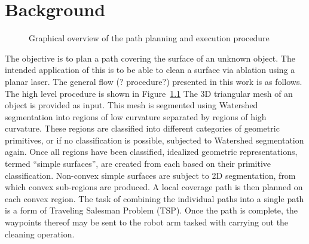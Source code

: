 \chapter{Background}

\begin{figure}[hb]
	\centering
{}
	\caption{Graphical overview of the path planning and execution procedure}
	\label{fig:bkgd_overview}
\end{figure}
The objective is to plan a path covering the surface of an unknown object.
The intended application of this is to be able to clean a surface via ablation using a planar laser.
The general flow (? procedure?) presented in this work is as follows.
The high level procedure is shown in Figure~\ref{fig:bkgd_overview}
The 3D triangular mesh of an object is provided as input.
This mesh is segmented using Watershed segmentation into regions of low curvature separated by regions of high curvature.
These regions are classified into different categories of geometric primitives, or if no classification is possible, subjected to Watershed segmentation again.
Once all regions have been classified, idealized geometric representations, termed ``simple surfaces'', are created from each based on their primitive classification.
Non-convex simple surfaces are subject to 2D segmentation, from which convex sub-regions are produced.
A local coverage path is then planned on each convex region.
The task of combining the individual paths into a single path is a form of Traveling Salesman Problem (TSP).
Once the path is complete, the waypoints thereof may be sent to the robot arm tasked with carrying out the cleaning operation.

